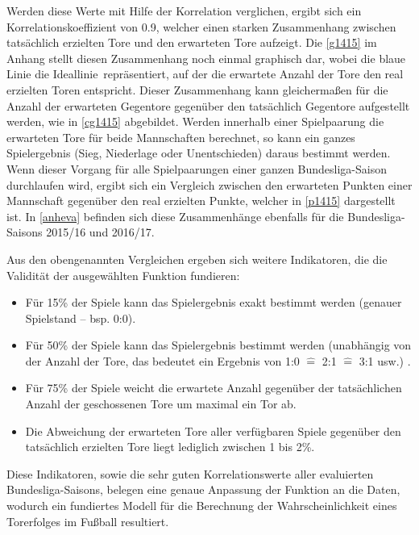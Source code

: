 Werden diese Werte mit Hilfe der Korrelation verglichen, ergibt sich ein Korrelationskoeffizient von \textsf{0.9}, welcher einen starken Zusammenhang zwischen tatsächlich erzielten Tore und den erwarteten Tore aufzeigt. Die \vref{g1415} im Anhang stellt diesen Zusammenhang noch einmal graphisch dar, wobei die blaue Linie die \glqq Ideallinie\grqq~repräsentiert, auf der die erwartete Anzahl der Tore den real erzielten Toren entspricht. Dieser Zusammenhang kann gleichermaßen für die Anzahl der erwarteten Gegentore gegenüber den tatsächlich Gegentore aufgestellt werden, wie in \vref{cg1415} abgebildet. Werden innerhalb einer Spielpaarung die erwarteten Tore für beide Mannschaften berechnet, so kann ein ganzes Spielergebnis (Sieg, Niederlage oder Unentschieden) daraus bestimmt werden. Wenn dieser Vorgang für alle Spielpaarungen einer ganzen Bundesliga-Saison durchlaufen wird, ergibt sich ein Vergleich zwischen den erwarteten Punkten einer Mannschaft gegenüber den real erzielten Punkte, welcher in \vref{p1415} dargestellt ist. In \vref{anheva} befinden sich diese Zusammenhänge ebenfalls für die Bundesliga-Saisons 2015/16 und 2016/17.

Aus den obengenannten Vergleichen ergeben sich weitere Indikatoren, die die Validität der ausgewählten Funktion fundieren:

\begin{itemize}
\item Für \textsf{15\%} der Spiele kann das Spielergebnis exakt bestimmt werden (genauer Spielstand – bsp.  \textsf{0:0}).
\item Für  \textsf{50\%} der Spiele kann das Spielergebnis bestimmt werden (unabhängig von der Anzahl der Tore, das bedeutet ein Ergebnis von \textsf{1:0 $\hat{=}$ 2:1 $\hat{=}$ 3:1} usw.) .
\item Für \textsf{75\%} der Spiele weicht die erwartete Anzahl gegenüber der tatsächlichen Anzahl der geschossenen Tore um maximal ein Tor ab.
\item Die Abweichung der erwarteten Tore aller verfügbaren Spiele gegenüber den tatsächlich erzielten Tore liegt lediglich zwischen \textsf{1} bis \textsf{2\%}.
\end{itemize}

Diese Indikatoren, sowie die sehr guten Korrelationswerte aller evaluierten Bundesliga-Saisons, belegen eine genaue Anpassung der Funktion an die Daten, wodurch ein fundiertes Modell für die Berechnung der Wahrscheinlichkeit eines Torerfolges im Fußball resultiert.